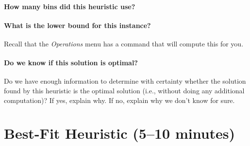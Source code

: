 \documentclass[11pt,letterpaper]{article}
\begin{document}
\vspace*{-0.25in}

\paragraph*{How many bins did this heuristic use?}

\vspace*{0.25in}

\paragraph*{What is the lower bound for this instance?} Recall that the
{\em Operations} menu has a command that will compute this for you.

\vspace*{0.25in}

\paragraph*{Do we know if this solution is optimal?} Do we have enough 
information to determine with certainty whether the solution found by
this heuristic is the optimal solution (i.e., without doing any additional
computation)? If yes, explain why. If no, explain why we don't know for sure.

\vspace*{0.5in}


\newpage

\section{Best-Fit Heuristic (5--10 minutes)}\label{sec:bf}

\end{document}
